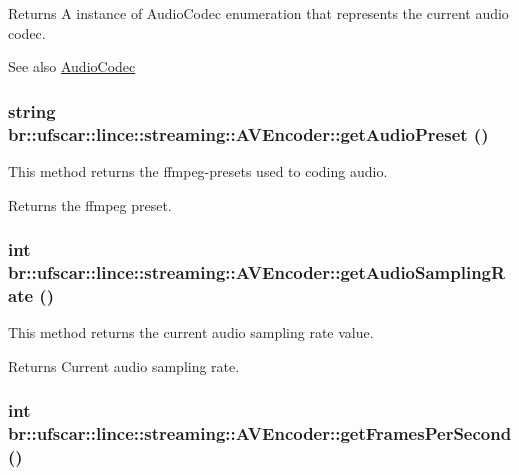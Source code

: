 \begin{DoxyReturn}{Returns}
A instance of AudioCodec enumeration that represents the current audio codec. 
\end{DoxyReturn}
\begin{DoxySeeAlso}{See also}
\hyperlink{namespacebr_1_1ufscar_1_1lince_1_1streaming_ad12fee1ac355f8db230ab5a750cbe2b2}{AudioCodec} 
\end{DoxySeeAlso}
\hypertarget{classbr_1_1ufscar_1_1lince_1_1streaming_1_1AVEncoder_a22c798c36bba4031f5d790b042f59d56}{
\subsubsection[{getAudioPreset}]{\setlength{\rightskip}{0pt plus 5cm}string br::ufscar::lince::streaming::AVEncoder::getAudioPreset ()}}
\label{classbr_1_1ufscar_1_1lince_1_1streaming_1_1AVEncoder_a22c798c36bba4031f5d790b042f59d56}


This method returns the ffmpeg-\/presets used to coding audio. 

\begin{DoxyReturn}{Returns}
the ffmpeg preset. 
\end{DoxyReturn}
\hypertarget{classbr_1_1ufscar_1_1lince_1_1streaming_1_1AVEncoder_a714347646dccf0a97e290e6a387799d5}{
\subsubsection[{getAudioSamplingRate}]{\setlength{\rightskip}{0pt plus 5cm}int br::ufscar::lince::streaming::AVEncoder::getAudioSamplingRate ()}}
\label{classbr_1_1ufscar_1_1lince_1_1streaming_1_1AVEncoder_a714347646dccf0a97e290e6a387799d5}


This method returns the current audio sampling rate value. 

\begin{DoxyReturn}{Returns}
Current audio sampling rate. 
\end{DoxyReturn}
\hypertarget{classbr_1_1ufscar_1_1lince_1_1streaming_1_1AVEncoder_a3e932dbc163c4a3207741b98d09362dc}{
\subsubsection[{getFramesPerSecond}]{\setlength{\rightskip}{0pt plus 5cm}int br::ufscar::lince::streaming::AVEncoder::getFramesPerSecond ()}}
\label{classbr_1_1ufscar_1_1lince_1_1streaming_1_1AVEncoder_a3e932dbc163c4a3207741b98d09362dc}


